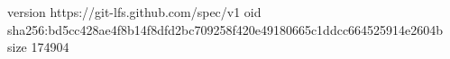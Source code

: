 version https://git-lfs.github.com/spec/v1
oid sha256:bd5cc428ae4f8b14f8dfd2bc709258f420e49180665c1ddcc664525914e2604b
size 174904
